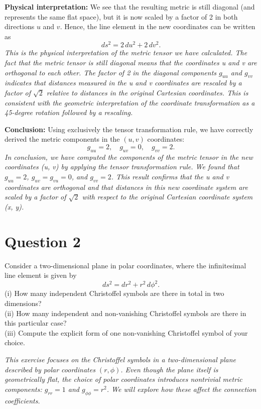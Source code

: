 \documentclass{article}
\begin{document}
\textbf{Physical interpretation:} We see that the resulting metric is still diagonal (and represents the same flat space), but it is now scaled by a factor of 2 in both directions \(u\) and \(v\). Hence, the line element in the new coordinates can be written as
\[
ds^2 = 2\,du^2 + 2\,dv^2.
\]
\emph{This is the physical interpretation of the metric tensor we have calculated. The fact that the metric tensor is still diagonal means that the coordinates u and v are orthogonal to each other. The factor of 2 in the diagonal components \(g_{uu}\) and \(g_{vv}\) indicates that distances measured in the u and v coordinates are rescaled by a factor of \(\sqrt{2}\) relative to distances in the original Cartesian coordinates. This is consistent with the geometric interpretation of the coordinate transformation as a 45-degree rotation followed by a rescaling.}

\textbf{Conclusion:}
Using exclusively the tensor transformation rule, we have correctly derived the metric components in the \((u, v)\) coordinates:
\[
g_{uu} = 2, 
\quad
g_{uv} = 0, 
\quad
g_{vv} = 2.
\]
\emph{In conclusion, we have computed the components of the metric tensor in the new coordinates (u, v) by applying the tensor transformation rule. We found that \(g_{uu} = 2\), \(g_{uv} = g_{vu} = 0\), and \(g_{vv} = 2\). This result confirms that the u and v coordinates are orthogonal and that distances in this new coordinate system are scaled by a factor of \(\sqrt{2}\) with respect to the original Cartesian coordinate system (x, y).}

\pagebreak

\section*{Question 2}

Consider a two-dimensional plane in polar coordinates, where the infinitesimal line element is given by
\[
ds^2 = dr^2 + r^2\,d\phi^2.
\]
(i) How many independent Christoffel symbols are there in total in two dimensions?\\
(ii) How many independent and non-vanishing Christoffel symbols are there in this particular case?\\
(iii) Compute the explicit form of one non-vanishing Christoffel symbol of your choice.

\emph{This exercise focuses on the Christoffel symbols in a two-dimensional plane described by polar coordinates \((r,\phi)\). Even though the plane itself is geometrically flat, the choice of polar coordinates introduces nontrivial metric components: \(g_{rr} = 1\) and \(g_{\phi\phi} = r^2\). We will explore how these affect the connection coefficients.}
\end{document}
